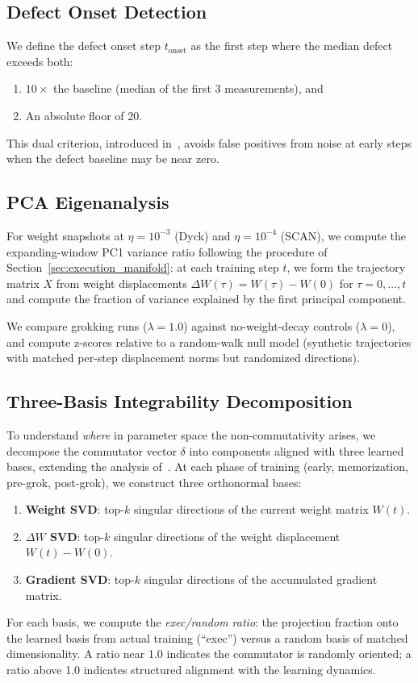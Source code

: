 \documentclass[11pt]{article}
\newcommand{\onsetstep}{t_{\text{onset}}}
\begin{document}
\subsection{Defect Onset Detection}

We define the defect onset step $\onsetstep$ as the first step where the median defect exceeds both:
\begin{enumerate}
  \item $10\times$ the baseline (median of the first 3 measurements), and
  \item An absolute floor of 20.
\end{enumerate}
This dual criterion, introduced in~\citet{xu2026integrability}, avoids false positives from noise at early steps when the defect baseline may be near zero.

\subsection{PCA Eigenanalysis}

For weight snapshots at $\eta = 10^{-3}$ (Dyck) and $\eta = 10^{-4}$ (SCAN), we compute the expanding-window PC1 variance ratio following the procedure of Section~\ref{sec:execution_manifold}: at each training step $t$, we form the trajectory matrix $X$ from weight displacements $\Delta W(\tau) = W(\tau) - W(0)$ for $\tau = 0, \ldots, t$ and compute the fraction of variance explained by the first principal component.

We compare grokking runs ($\lambda = 1.0$) against no-weight-decay controls ($\lambda = 0$), and compute z-scores relative to a random-walk null model (synthetic trajectories with matched per-step displacement norms but randomized directions).

\subsection{Three-Basis Integrability Decomposition}

To understand \emph{where} in parameter space the non-commutativity arises, we decompose the commutator vector $\delta$ into components aligned with three learned bases, extending the analysis of~\citet{xu2026integrability}. At each phase of training (early, memorization, pre-grok, post-grok), we construct three orthonormal bases:
\begin{enumerate}
  \item \textbf{Weight SVD}: top-$k$ singular directions of the current weight matrix $W(t)$.
  \item \textbf{$\Delta W$ SVD}: top-$k$ singular directions of the weight displacement $W(t) - W(0)$.
  \item \textbf{Gradient SVD}: top-$k$ singular directions of the accumulated gradient matrix.
\end{enumerate}
For each basis, we compute the \emph{exec/random ratio}: the projection fraction onto the learned basis from actual training (``exec'') versus a random basis of matched dimensionality. A ratio near 1.0 indicates the commutator is randomly oriented; a ratio above 1.0 indicates structured alignment with the learning dynamics.
\end{document}
